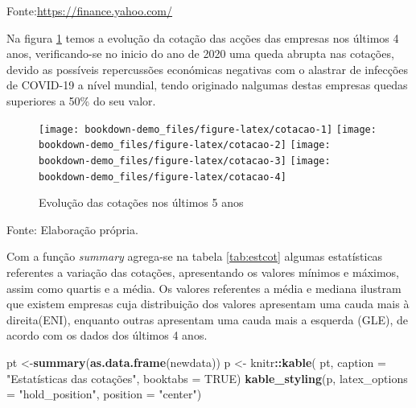 \documentclass[
  12pt,
  a4paper,
  openany]{book}
\newenvironment{Shaded}{\begin{snugshade}}{\end{snugshade}}
\newcommand{\DataTypeTok}[1]{\textcolor[rgb]{0.13,0.29,0.53}{#1}}
\newcommand{\KeywordTok}[1]{\textcolor[rgb]{0.13,0.29,0.53}{\textbf{#1}}}
\newcommand{\NormalTok}[1]{#1}
\newcommand{\OperatorTok}[1]{\textcolor[rgb]{0.81,0.36,0.00}{\textbf{#1}}}
\newcommand{\OtherTok}[1]{\textcolor[rgb]{0.56,0.35,0.01}{#1}}
\newcommand{\StringTok}[1]{\textcolor[rgb]{0.31,0.60,0.02}{#1}}
\begin{document}
Fonte:\url{https://finance.yahoo.com/}

\justifying
\bigskip

Na figura \ref{fig:cotacao} temos a evolução da cotação das acções das empresas nos últimos 4 anos, verificando-se no inicio do ano de 2020 uma queda abrupta nas cotações, devido as possíveis repercussões económicas negativas com o alastrar de infecções de COVID-19 a nível mundial, tendo originado nalgumas destas empresas quedas superiores a 50\% do seu valor.

\begin{figure}

{\centering \texttt{[image: bookdown-demo\_files/figure-latex/cotacao-1]} \texttt{[image: bookdown-demo\_files/figure-latex/cotacao-2]} \texttt{[image: bookdown-demo\_files/figure-latex/cotacao-3]} \texttt{[image: bookdown-demo\_files/figure-latex/cotacao-4]} 

}

\caption{Evolução das cotações nos últimos 5 anos}\label{fig:cotacao}
\end{figure}
\FloatBarrier
\centering

Fonte: Elaboração própria.

\justifying
\bigskip

Com a função \emph{summary} agrega-se na tabela \ref{tab:estcot} algumas estatísticas referentes a variação das cotações, apresentando os valores mínimos e máximos, assim como quartis e a média. Os valores referentes a média e mediana ilustram que existem empresas cuja distribuição dos valores apresentam uma cauda mais à direita(ENI), enquanto outras apresentam uma cauda mais a esquerda (GLE), de acordo com os dados dos últimos 4 anos.

\scriptsize

\begin{Shaded}
\begin{Highlighting}[]
\NormalTok{pt \textless{}{-}}\KeywordTok{summary}\NormalTok{(}\KeywordTok{as.data.frame}\NormalTok{(newdata))}
\NormalTok{p \textless{}{-}}\StringTok{ }\NormalTok{knitr}\OperatorTok{::}\KeywordTok{kable}\NormalTok{(}
\NormalTok{  pt, }\DataTypeTok{caption =} \StringTok{"Estatísticas das cotações"}\NormalTok{,}
  \DataTypeTok{booktabs =} \OtherTok{TRUE}\NormalTok{)}
\KeywordTok{kable\_styling}\NormalTok{(p, }\DataTypeTok{latex\_options =} \StringTok{"hold\_position"}\NormalTok{, }\DataTypeTok{position =} \StringTok{"center"}\NormalTok{)}
\end{Highlighting}
\end{Shaded}
\end{document}
